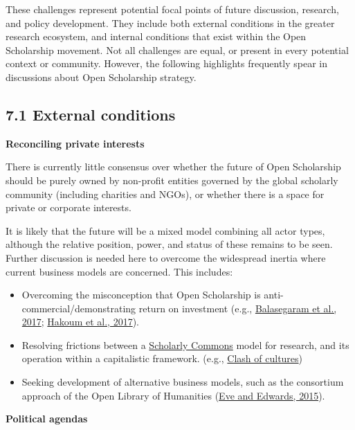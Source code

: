 These challenges represent potential focal points of future discussion,
research, and policy development. They include both external conditions
in the greater research ecosystem, and internal conditions that exist
within the Open Scholarship movement. Not all challenges are equal, or
present in every potential context or community. However, the following
highlights frequently spear in discussions about Open Scholarship
strategy.

\subsection{7.1 External conditions }\label{external-conditions}

\textbf{Reconciling private interests}

There is currently little consensus over whether the future of Open
Scholarship should be purely owned by non-profit entities governed by
the global scholarly community (including charities and NGOs), or
whether there is a space for private or corporate interests.

It is likely that the future will be a mixed model combining all actor
types, although the relative position, power, and status of these
remains to be seen. Further discussion is needed here to overcome the
widespread inertia where current business models are concerned. This
includes:

\begin{itemize}
\item
  Overcoming the misconception that Open Scholarship is
  anti-commercial/demonstrating return on investment (e.g.,
  \href{https://doi.org/10.1371/journal.pmed.1002276}{Balasegaram et
  al., 2017}; \href{https://doi.org/10.1136/bmjopen-2017-015997}{Hakoum
  et al., 2017}).
\item
  Resolving frictions between a
  \href{https://www.force11.org/group/scholarly-commons-working-group}{Scholarly
  Commons} model for research, and its operation within a capitalistic
  framework. (e.g.,
  \href{https://danielskatzblog.wordpress.com/2016/10/25/clash-of-cultures-why-all-science-isnt-open-science/}{Clash
  of cultures})
\item
  Seeking development of alternative business models, such as the
  consortium approach of the Open Library of Humanities
  (\href{https://doi.org/10.16995/olh.46}{Eve and Edwards, 2015}).
\end{itemize}

\textbf{Political agendas}


